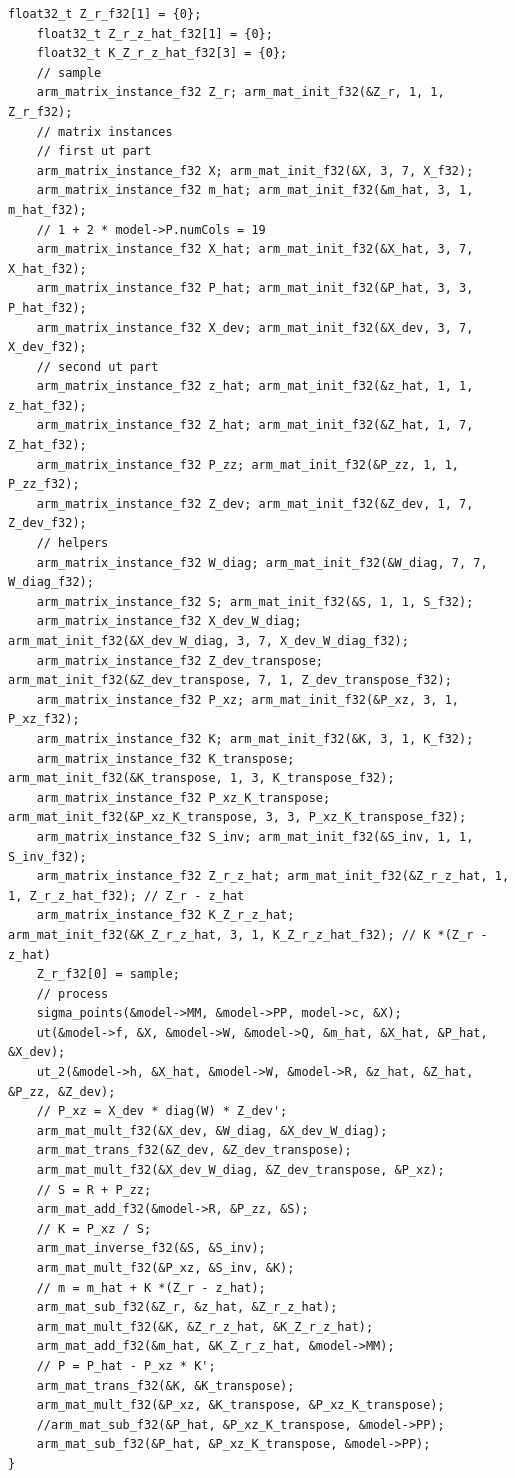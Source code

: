 \begin{lstlisting}[caption=kalman.c]
    float32_t Z_r_f32[1] = {0};
    float32_t Z_r_z_hat_f32[1] = {0};
    float32_t K_Z_r_z_hat_f32[3] = {0};
    // sample
    arm_matrix_instance_f32 Z_r; arm_mat_init_f32(&Z_r, 1, 1, Z_r_f32);
    // matrix instances
    // first ut part
    arm_matrix_instance_f32 X; arm_mat_init_f32(&X, 3, 7, X_f32);
    arm_matrix_instance_f32 m_hat; arm_mat_init_f32(&m_hat, 3, 1, m_hat_f32);
    // 1 + 2 * model->P.numCols = 19
    arm_matrix_instance_f32 X_hat; arm_mat_init_f32(&X_hat, 3, 7, X_hat_f32);
    arm_matrix_instance_f32 P_hat; arm_mat_init_f32(&P_hat, 3, 3, P_hat_f32);
    arm_matrix_instance_f32 X_dev; arm_mat_init_f32(&X_dev, 3, 7, X_dev_f32);
    // second ut part
    arm_matrix_instance_f32 z_hat; arm_mat_init_f32(&z_hat, 1, 1, z_hat_f32);
    arm_matrix_instance_f32 Z_hat; arm_mat_init_f32(&Z_hat, 1, 7, Z_hat_f32);
    arm_matrix_instance_f32 P_zz; arm_mat_init_f32(&P_zz, 1, 1, P_zz_f32);
    arm_matrix_instance_f32 Z_dev; arm_mat_init_f32(&Z_dev, 1, 7, Z_dev_f32);
    // helpers
    arm_matrix_instance_f32 W_diag; arm_mat_init_f32(&W_diag, 7, 7, W_diag_f32);
    arm_matrix_instance_f32 S; arm_mat_init_f32(&S, 1, 1, S_f32);
    arm_matrix_instance_f32 X_dev_W_diag; arm_mat_init_f32(&X_dev_W_diag, 3, 7, X_dev_W_diag_f32);
    arm_matrix_instance_f32 Z_dev_transpose; arm_mat_init_f32(&Z_dev_transpose, 7, 1, Z_dev_transpose_f32);
    arm_matrix_instance_f32 P_xz; arm_mat_init_f32(&P_xz, 3, 1, P_xz_f32);
    arm_matrix_instance_f32 K; arm_mat_init_f32(&K, 3, 1, K_f32);
    arm_matrix_instance_f32 K_transpose; arm_mat_init_f32(&K_transpose, 1, 3, K_transpose_f32);
    arm_matrix_instance_f32 P_xz_K_transpose; arm_mat_init_f32(&P_xz_K_transpose, 3, 3, P_xz_K_transpose_f32);
    arm_matrix_instance_f32 S_inv; arm_mat_init_f32(&S_inv, 1, 1, S_inv_f32);
    arm_matrix_instance_f32 Z_r_z_hat; arm_mat_init_f32(&Z_r_z_hat, 1, 1, Z_r_z_hat_f32); // Z_r - z_hat
    arm_matrix_instance_f32 K_Z_r_z_hat; arm_mat_init_f32(&K_Z_r_z_hat, 3, 1, K_Z_r_z_hat_f32); // K *(Z_r - z_hat)
    Z_r_f32[0] = sample;
    // process
    sigma_points(&model->MM, &model->PP, model->c, &X);
    ut(&model->f, &X, &model->W, &model->Q, &m_hat, &X_hat, &P_hat, &X_dev);
    ut_2(&model->h, &X_hat, &model->W, &model->R, &z_hat, &Z_hat, &P_zz, &Z_dev);
    // P_xz = X_dev * diag(W) * Z_dev';
    arm_mat_mult_f32(&X_dev, &W_diag, &X_dev_W_diag);
    arm_mat_trans_f32(&Z_dev, &Z_dev_transpose);
    arm_mat_mult_f32(&X_dev_W_diag, &Z_dev_transpose, &P_xz);
    // S = R + P_zz;
    arm_mat_add_f32(&model->R, &P_zz, &S);
    // K = P_xz / S;
    arm_mat_inverse_f32(&S, &S_inv);
    arm_mat_mult_f32(&P_xz, &S_inv, &K);
    // m = m_hat + K *(Z_r - z_hat);
    arm_mat_sub_f32(&Z_r, &z_hat, &Z_r_z_hat);
    arm_mat_mult_f32(&K, &Z_r_z_hat, &K_Z_r_z_hat);
    arm_mat_add_f32(&m_hat, &K_Z_r_z_hat, &model->MM);
    // P = P_hat - P_xz * K';
    arm_mat_trans_f32(&K, &K_transpose);
    arm_mat_mult_f32(&P_xz, &K_transpose, &P_xz_K_transpose);
    //arm_mat_sub_f32(&P_hat, &P_xz_K_transpose, &model->PP);
    arm_mat_sub_f32(&P_hat, &P_xz_K_transpose, &model->PP);
}
\end{lstlisting}

